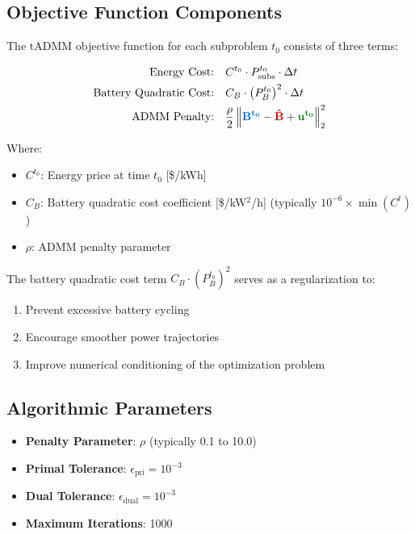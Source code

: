 \documentclass[11pt]{article}
\newcommand{\blueB}[1]{\textcolor{bluevar}{\mathbf{#1}}}      %
\newcommand{\redBhat}[1]{\textcolor{redvar}{\mathbf{#1}}}     %
\newcommand{\greenu}[1]{\textcolor{greenvar}{\mathbf{#1}}}    %
\begin{document}
\subsection{Objective Function Components}

The tADMM objective function for each subproblem $t_0$ consists of three terms:

\begin{align}
\text{Energy Cost:} \quad & C^{t_0} \cdot P_{\text{subs}}^{t_0} \cdot \Delta t \\
\text{Battery Quadratic Cost:} \quad & C_B \cdot \left(P_{B}^{t_0}\right)^2 \cdot \Delta t \\
\text{ADMM Penalty:} \quad & \frac{\rho}{2} \left\| \blueB{B^{t_0}} - \redBhat{\hat{B}} + \greenu{u^{t_0}} \right\|_2^2
\end{align}

Where:
\begin{itemize}
    \item $C^{t_0}$: Energy price at time $t_0$ [\$/kWh]
    \item $C_B$: Battery quadratic cost coefficient [\$/kW$^2$/h] (typically $10^{-6} \times \min(C^t)$)
    \item $\rho$: ADMM penalty parameter
\end{itemize}

The battery quadratic cost term $C_B \cdot \left(P_{B}^{t_0}\right)^2$ serves as a regularization to:
\begin{enumerate}
    \item Prevent excessive battery cycling
    \item Encourage smoother power trajectories
    \item Improve numerical conditioning of the optimization problem
\end{enumerate}

\subsection{Algorithmic Parameters}

\begin{itemize}
    \item \textbf{Penalty Parameter}: $\rho$ (typically 0.1 to 10.0)
    \item \textbf{Primal Tolerance}: $\epsilon_{\text{pri}} = 10^{-3}$
    \item \textbf{Dual Tolerance}: $\epsilon_{\text{dual}} = 10^{-3}$
    \item \textbf{Maximum Iterations}: 1000
\end{itemize}
\end{document}

